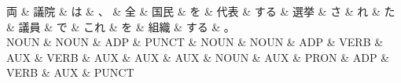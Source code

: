 \documentclass[tikz,border=5pt]{standalone}
\begin{document}
\normalsize
\begin{dependency}[edge unit distance=12.0pt]
    \begin{deptext}[column sep=1em]
        両 \& 議院 \& は \& 、 \& 全 \& 国民 \& を \& 代表 \& する \& 選挙 \& さ \& れ \& た \& 議員 \& で \& これ \& を \& 組織 \& する \& 。\\
        NOUN \& NOUN \& ADP \& PUNCT \& NOUN \& NOUN \& ADP \& VERB \& AUX \& VERB \& AUX \& AUX \& AUX \& NOUN \& AUX \& PRON \& ADP \& VERB \& AUX \& PUNCT\\
    \end{deptext}
\end{dependency}
\end{document}
